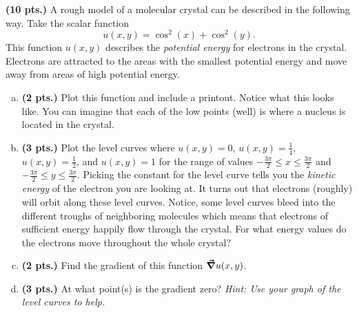 \documentclass[12pt]{article} %
\begin{document}
\vspace*{0.5cm}

\begin{problem}
\textbf{(10 pts.)} A rough model of a molecular crystal can be described in the following way. Take the scalar function
\[
u(x,y)=\cos^2(x)+\cos^2(y).
\]
This function $u(x,y)$ describes the \emph{potential energy} for electrons in the crystal. Electrons are attracted to the areas with the smallest potential energy and move away from areas of high potential energy.
\begin{enumerate}[(a)]
    \item \textbf{(2 pts.)} Plot this function and include a printout.  Notice what this looks like.  You can imagine that each of the low points (well) is where a nucleus is located in the crystal.
    \item \textbf{(3 pts.)} Plot the level curves where $u(x,y)=0$, $u(x,y)=\frac{1}{4}$, $u(x,y)=\frac{1}{2}$, and $u(x,y)=1$ for the range of values $-\frac{3\pi}{2}\leq x \leq \frac{3\pi}{2}$ and $-\frac{3\pi}{2}\leq y \leq \frac{3\pi}{2}$. Picking the constant for the level curve tells you the \emph{kinetic energy} of the electron you are looking at.  It turns out that electrons (roughly) will orbit along these level curves.  Notice, some level curves bleed into the different troughs of neighboring molecules which means that electrons of sufficient energy happily flow through the crystal. For what energy values do the electrons move throughout the whole crystal?
    \item \textbf{(2 pts.)} Find the gradient of this function $\boldsymbol{\vec{\nabla}} u(x,y)$.
    \item \textbf{(3 pts.)} At what point(s) is the gradient zero? \emph{Hint: Use your graph of the level curves to help.}
    \end{enumerate}
\end{problem}
\end{document}
